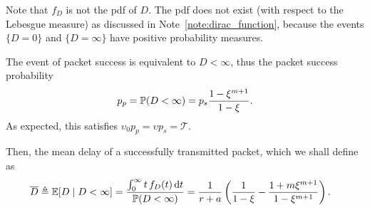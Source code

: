 \begin{note}
    Note that $f_D$ is not the pdf of $D$. The pdf does not exist (with respect to the Lebesgue measure) as discussed in Note~\ref{note:dirac_function}, because the events $\{D=0\}$ and $\{D=\infty\}$ have positive probability measures.
\end{note}

The event of packet success is equivalent to $D<\infty$, thus the packet success probability
%
\begin{align} \label{eq:pps}
    p_p = \P(D<\infty) = p_s\frac{1-\xi^{m+1}}{1-\xi}.
\end{align}
%
As expected, this satisfies $\upsilon_0 p_p = \upsilon p_s = \mathscr{T}$. %

Then, the mean delay of a successfully transmitted packet, which we shall define as
\begin{align} \label{eq:delay}
    \overline{D} \triangleq \E[D\mid D<\infty] &= \frac{\int_0^\infty t\, f_D(t)\, \d t}{\P(D<\infty)} 
        = \frac{1}{r+a}\left(\frac{1}{1-\xi} - \frac{1+m\xi^{m+1}}{1-\xi^{m+1}}\right).
\end{align}

